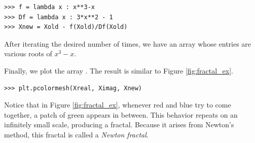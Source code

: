 \begin{lstlisting}
>>> f = lambda x : x**3-x
>>> Df = lambda x : 3*x**2 - 1
>>> Xnew = Xold - f(Xold)/Df(Xold)
\end{lstlisting}

After iterating the desired number of times, we have an array  whose entries are various roots of $x^3-x$.

Finally, we plot the array . The result is similar to Figure \ref{fig:fractal_ex}.

\begin{lstlisting}
>>> plt.pcolormesh(Xreal, Ximag, Xnew)
\end{lstlisting}

Notice that in Figure \ref{fig:fractal_ex}, whenever red and blue try to come together, a patch of green appears in between.
This behavior repeats on an infinitely small scale, producing a fractal.
Because it arises from Newton's method, this fractal is called a \emph{Newton fractal}.

